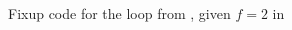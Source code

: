 \begin{figure}
	\begin{adjustbox}{max height=\textheight}
		
	\end{adjustbox}
	\caption{Fixup code for the loop from , given $f = 2$ in \libFIRM}\label{fig:impl:fixup:duff:fixup-firm}
\end{figure}